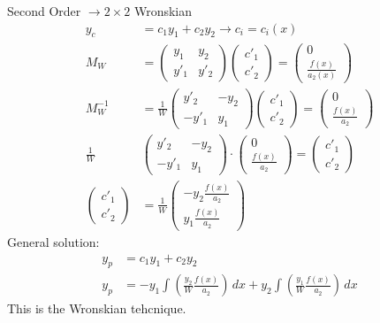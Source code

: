 \documentclass[Maths.tex]{subfiles}
\begin{document}
\begin{example}[2nd Order]
Second Order $\to 2\times2$ Wronskian
\begin{align}
    y_c &= c_1y_1 + c_2y_2 \to c_i = c_i(x) \\
    M_W &= \begin{pmatrix} y_1 & y_2 \\ y'_1 & y'_2 \end{pmatrix}\begin{pmatrix} c'_1 \\ c'_2 \end{pmatrix} = \begin{pmatrix} 0 \\ \frac{f(x)}{a_2(x)} \end{pmatrix} \\
    M_W^{-1} &= \frac{1}{W} \begin{pmatrix} y'_2 & -y_2 \\ -y'_1 & y_1 \end{pmatrix} \begin{pmatrix} c'_1 \\ c'_2 \end{pmatrix} = \begin{pmatrix} 0 \\ \frac{f(x)}{a_2} \end{pmatrix} \\
    \frac{1}{W}&\begin{pmatrix} y'_2 & -y_2 \\ -y'_1 & y_1 \end{pmatrix}\cdot \begin{pmatrix} 0 \\ \frac{f(x)}{a_2} \end{pmatrix} = \begin{pmatrix} c'_1 \\ c'_2 \end{pmatrix} \\
    \begin{pmatrix} c'_1 \\ c'_2 \end{pmatrix} &= \frac{1}{W}\begin{pmatrix} -y_2\frac{f(x)}{a_2} \\ y_1\frac{f(x)}{a_2} \end{pmatrix}
\end{align}
General solution:
\begin{align}
    y_p &= c_1y_1 + c_2y_2 \\
    y_p &= -y_1\int \left(\frac{y_2}{W}\frac{f(x)}{a_2}\right)\,dx + y_2\int \left(\frac{y_1}{W}\frac{f(x)}{a_2}\right)\,dx
\end{align}
This is the Wronskian tehcnique.
\end{example}
\end{document}
